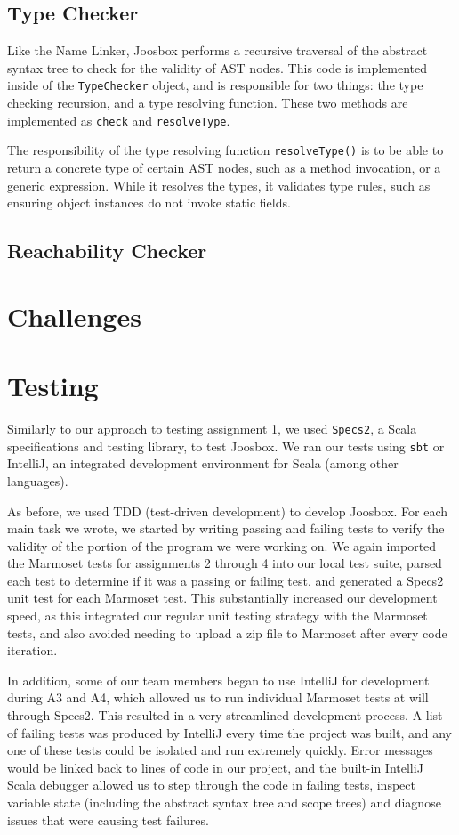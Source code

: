 \documentclass[letterpaper]{article}
\begin{document}
  \subsection{Type Checker}

  Like the Name Linker, Joosbox performs a recursive traversal of the abstract
  syntax tree to check for the validity of AST nodes. This code is implemented
  inside of the {\tt TypeChecker} object, and is responsible for two things: the
  type checking recursion, and a type resolving function. These two methods are
  implemented as {\tt check} and {\tt resolveType}.

  The responsibility of the type resolving function {\tt resolveType()} is to be
  able to return a concrete type of certain AST nodes, such as a method
  invocation, or a generic expression. While it resolves the types, it validates
  type rules, such as ensuring object instances do not invoke static fields.


  \subsection{Reachability Checker}

  \section{Challenges}

  \section{Testing}

  Similarly to our approach to testing assignment 1, we used {\tt Specs2}, a
  Scala specifications and testing library, to test Joosbox. We ran our tests
  using {\tt sbt} or IntelliJ, an integrated development environment for Scala
  (among other languages).

  As before, we used TDD (test-driven development) to develop Joosbox. For
  each main task we wrote, we started by writing passing and failing tests to
  verify the validity of the portion of the program we were working on. We
  again imported the Marmoset tests for assignments 2 through 4 into our local
  test suite, parsed each test to determine if it was a passing or failing
  test, and generated a Specs2 unit test for each Marmoset test. This
  substantially increased our development speed, as this integrated our
  regular unit testing strategy with the Marmoset tests, and also avoided
  needing to upload a zip file to Marmoset after every code iteration.

  In addition, some of our team members began to use IntelliJ for development
  during A3 and A4, which allowed us to run individual Marmoset tests at will
  through Specs2. This resulted in a very streamlined development process. A
  list of failing tests was produced by IntelliJ every time the project was
  built, and any one of these tests could be isolated and run extremely
  quickly. Error messages would be linked back to lines of code in our
  project, and the built-in IntelliJ Scala debugger allowed us to step through
  the code in failing tests, inspect variable state (including the abstract
  syntax tree and scope trees) and diagnose issues that were causing test
  failures.
\end{document}
